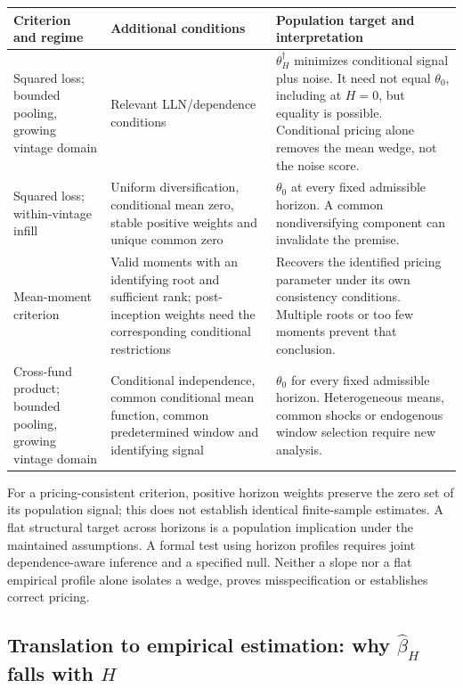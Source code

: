 \documentclass[11pt]{article}
\theoremstyle{plain}
\theoremstyle{definition}
\begin{document}
{\small
\begin{longtable}{@{}L{3.0cm}L{4.5cm}L{7.8cm}@{}}
\toprule
Criterion and regime & Additional conditions & Population target and interpretation\\
\midrule
\endhead
Squared loss; bounded pooling, growing vintage domain & Relevant LLN/dependence conditions & $\theta_H^\dagger$ minimizes conditional signal plus noise. It need not equal $\theta_0$, including at $H=0$, but equality is possible. Conditional pricing alone removes the mean wedge, not the noise score.\\
Squared loss; within-vintage infill & Uniform diversification, conditional mean zero, stable positive weights and unique common zero & $\theta_0$ at every fixed admissible horizon. A common nondiversifying component can invalidate the premise.\\
Mean-moment criterion & Valid moments with an identifying root and sufficient rank; post-inception weights need the corresponding conditional restrictions & Recovers the identified pricing parameter under its own consistency conditions. Multiple roots or too few moments prevent that conclusion.\\
Cross-fund product; bounded pooling, growing vintage domain & Conditional independence, common conditional mean function, common predetermined window and identifying signal & $\theta_0$ for every fixed admissible horizon. Heterogeneous means, common shocks or endogenous window selection require new analysis.\\
\bottomrule
\end{longtable}
}

For a pricing-consistent criterion, positive horizon weights preserve the zero set of its population signal; this does not establish identical finite-sample estimates. A flat structural target across horizons is a population implication under the maintained assumptions. A formal test using horizon profiles requires joint dependence-aware inference and a specified null. Neither a slope nor a flat empirical profile alone isolates a wedge, proves misspecification or establishes correct pricing.

\subsection{Translation to empirical estimation: why \texorpdfstring{$\hat\beta_H$}{beta\_H} falls with \texorpdfstring{$H$}{H}}
\label{sec:emp_translation}
\end{document}
